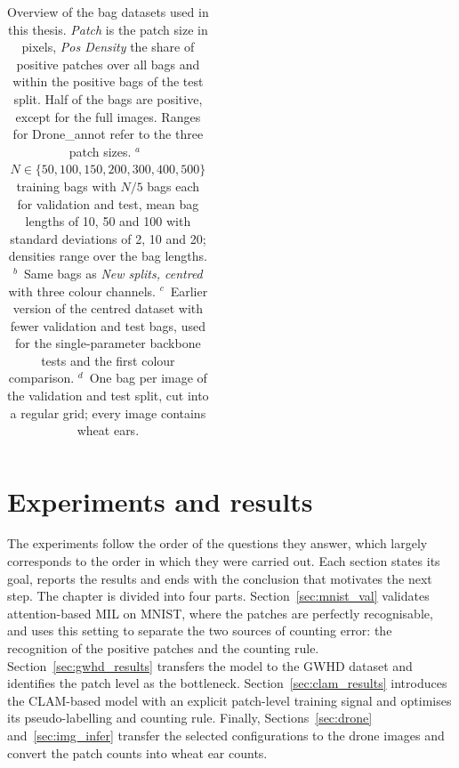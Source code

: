 \documentclass[12pt,parskip = half, DIV=classic,listof=totoc]{scrartcl}
\begin{document}
\begin{table}[t]
\begin{tabular}{@{}llccccc@{}}
					\bottomrule
				\end{tabular}
				\caption[Overview of the bag datasets used in this thesis]{Overview of the bag datasets used in this thesis. \emph{Patch} is the patch size in pixels,
				\emph{Pos Density} the share of positive patches over all bags and within the positive bags of the test split.
				Half of the bags are positive, except for the full images. Ranges for Drone\_annot refer to the three patch sizes.
				$^{a}$~$N \in \{50, 100, 150, 200, 300, 400, 500\}$ training bags with $N/5$ bags each for validation and test, mean bag
				lengths of 10, 50 and 100 with standard deviations of 2, 10 and 20; densities range over the bag lengths.
				$^{b}$~Same bags as \emph{New splits, centred} with three colour channels.
				$^{c}$~Earlier version of the centred dataset with fewer validation and test bags, used for the single-parameter backbone tests
				and the first colour comparison.
				$^{d}$~One bag per image of the validation and test split, cut into a regular grid; every image contains wheat ears.}
				\label{tab:bags}
			\end{table}


	\section{Experiments and results}
		The experiments follow the order of the questions they answer, which largely
		corresponds to the order in which they were carried out. Each section states its
		goal, reports the results and ends with the conclusion that motivates the next step.
		The chapter is divided into four parts. Section~\ref{sec:mnist_val} validates
		attention-based MIL on MNIST, where the patches are perfectly recognisable, and
		uses this setting to separate the two sources of counting error: the recognition of
		the positive patches and the counting rule. Section~\ref{sec:gwhd_results} transfers the model
		to the GWHD dataset and identifies the patch level as the bottleneck.
		Section~\ref{sec:clam_results} 
		introduces the CLAM-based model with an explicit patch-level training signal and
		optimises its pseudo-labelling and counting rule. Finally,
		Sections~\ref{sec:drone} and~\ref{sec:img_infer} 
		transfer the selected configurations to the drone images and convert the patch
		counts into wheat ear counts.
\end{document}

